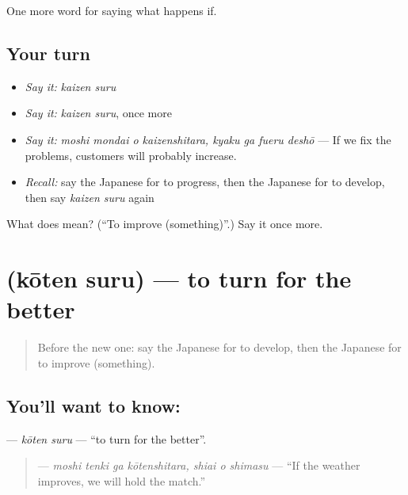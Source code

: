 \begin{grammarlens}[title={What you've built}]
One more word for saying what happens if.
\end{grammarlens}

\subsection*{Your turn}
\begin{itemize}
\raggedright
  \item \emph{Say it:} \emph{kaizen suru}
  \item \emph{Say it:} \emph{kaizen suru}, once more
  \item \emph{Say it:} \emph{moshi mondai o kaizenshitara, kyaku ga fueru deshō} — If we fix the problems, customers will probably increase.
  \item \emph{Recall:} say the Japanese for to progress, then the Japanese for to develop, then say \emph{kaizen suru} again
\end{itemize}

\begin{tcolorbox}[breakable,colback=teal!4,colframe=teal!35!black,title={Before you move on}]
What does  mean? (\textquotedblleft{}To improve (something)\textquotedblright{}.) Say it once more.
\end{tcolorbox}
\section[\texorpdfstring{\ja{こうてんする} (kōten suru)}{こうてんする (kōten suru)}]{ (kōten suru) — to turn for the better}

\label{lesson:JA-C526-kouten-suru}



\begin{quote}
Before the new one: say the Japanese for to develop, then the Japanese for to improve (something).
\end{quote}

\subsection*{You'll want to know: }
\textbf{} — \emph{kōten suru} — \textquotedblleft{}to turn for the better\textquotedblright{}.

\begin{quote}
\textbf{   } — \emph{moshi tenki ga kōtenshitara, shiai o shimasu} — \textquotedblleft{}If the weather improves, we will hold the match.\textquotedblright{}
\end{quote}

